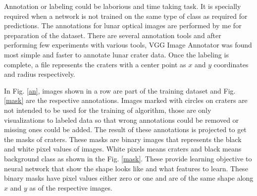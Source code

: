 \documentclass[11pt]{article}
\begin{document}
Annotation or labeling could be laborious and time taking task. It is specially required when a network is not trained on the same type of class as required for predictions. The annotations for lunar optical images are performed by me for preparation of the dataset. There are several annotation tools and after performing few experiments with various tools, VGG Image Annotator was found most simple and faster to annotate lunar crater data. Once the labeling is complete, a file represents the craters with a center point as $x$ and $y$ coordinates and radius respectively.

In Fig. \ref{an}, images shown in a row are part of the training dataset and Fig. \ref{mask} are the respective annotations. Images marked with circles on craters are not intended to be used for the training of algorithm, those are only visualizations to labeled data so that wrong annotations could be removed or missing ones could be added. The result of these annotations is projected to get the masks of craters. These masks are binary images that represents the black and white pixel values of images. White pixels means craters and black means background class as shown in the Fig. \ref{mask}. These provide learning objective to neural network that show the shape looks like and what features to learn. These binary masks have pixel values either zero or one and are of the same shape along $x$ and $y$ as of the respective images.
\end{document}
